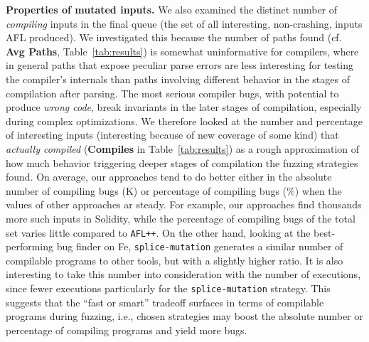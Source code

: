 \textbf{Properties of mutated inputs.} We also examined the distinct number of
\emph{compiling} inputs in the final queue (the set of all interesting,
non-crashing, inputs AFL produced).  We investigated this because the number of
paths found (cf. \textbf{Avg Paths}, Table~\ref{tab:results}) is somewhat
uninformative for compilers, where in general paths that expose peculiar parse
errors are less interesting for testing the compiler's internals than paths
involving different behavior in the stages of compilation after parsing.  The
most serious compiler bugs, with potential to produce \emph{wrong code}, break
invariants in the later stages of compilation, especially during complex
optimizations.  We therefore looked at the number and percentage of interesting
inputs (interesting because of new coverage of some kind) that \emph{actually
compiled} (\textbf{Compiles} in Table~\ref{tab:results}) as a rough
approximation of how much behavior triggering deeper stages of compilation the
fuzzing strategies found. On average, our approaches tend to do better either
in the absolute number of compiling bugs (K) or percentage of compiling bugs
(\%) when the values of other approaches ar steady. For example, our approaches
find thousands more such inputs in Solidity, while the percentage of compiling
bugs of the total set varies little compared to \texttt{AFL++}. On the other hand,
looking at the best-performing bug finder on Fe, \texttt{splice-mutation}
generates a similar number of compilable programs to other tools, but with a slightly
higher ratio. It is also interesting to take this number into consideration
with the number of executions, since fewer executions particularly for the \texttt{splice-mutation}
strategy. This suggests that the ``fast or smart'' tradeoff surfaces in terms of
compilable programs during fuzzing, i.e., chosen strategies may boost the
absolute number or percentage of compiling programs and yield more bugs.
